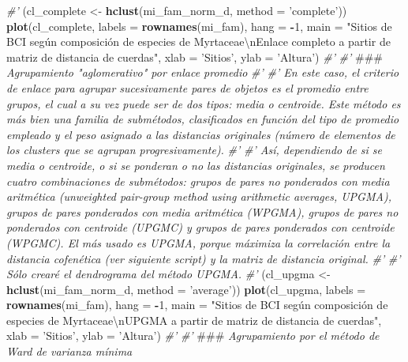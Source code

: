 \documentclass[11pt,]{article}
\newenvironment{Shaded}{\begin{snugshade}}{\end{snugshade}}
\newcommand{\KeywordTok}[1]{\textcolor[rgb]{0.13,0.29,0.53}{\textbf{#1}}}
\newcommand{\DataTypeTok}[1]{\textcolor[rgb]{0.13,0.29,0.53}{#1}}
\newcommand{\DecValTok}[1]{\textcolor[rgb]{0.00,0.00,0.81}{#1}}
\newcommand{\CharTok}[1]{\textcolor[rgb]{0.31,0.60,0.02}{#1}}
\newcommand{\StringTok}[1]{\textcolor[rgb]{0.31,0.60,0.02}{#1}}
\newcommand{\CommentTok}[1]{\textcolor[rgb]{0.56,0.35,0.01}{\textit{#1}}}
\newcommand{\OperatorTok}[1]{\textcolor[rgb]{0.81,0.36,0.00}{\textbf{#1}}}
\newcommand{\AlertTok}[1]{\textcolor[rgb]{0.94,0.16,0.16}{#1}}
\newcommand{\NormalTok}[1]{#1}
\begin{document}
\begin{Shaded}
\begin{Highlighting}[]
{\CommentTok{#' }
\NormalTok{(cl_complete <-}\StringTok{ }\KeywordTok{hclust}\NormalTok{(mi_fam_norm_d, }\DataTypeTok{method =} \StringTok{'complete'}\NormalTok{))}
\KeywordTok{plot}\NormalTok{(cl_complete, }\DataTypeTok{labels =} \KeywordTok{rownames}\NormalTok{(mi_fam), }\DataTypeTok{hang =} \OperatorTok{-}\DecValTok{1}\NormalTok{,}
     \DataTypeTok{main =} \StringTok{"Sitios de BCI según composición de especies de Myrtaceae}\CharTok{\textbackslash{}n}\StringTok{Enlace completo a partir de matriz de distancia de cuerdas"}\NormalTok{,}
     \DataTypeTok{xlab =} \StringTok{'Sitios'}\NormalTok{, }\DataTypeTok{ylab =} \StringTok{'Altura'}\NormalTok{)}
\CommentTok{#' }
\CommentTok{#' }\AlertTok{###}\CommentTok{ Agrupamiento "aglomerativo" por enlace promedio}
\CommentTok{#' }
\CommentTok{#' En este caso, el criterio de enlace para agrupar sucesivamente pares de objetos es el promedio entre grupos, el cual a su vez puede ser de dos tipos: media o centroide. Este método es más bien una familia de submétodos, clasificados en función del tipo de promedio empleado y el peso asignado a las distancias originales (número de elementos de los clusters que se agrupan progresivamente).}
\CommentTok{#' }
\CommentTok{#' Así, dependiendo de si se media o centroide, o si se ponderan o no las distancias originales, se producen cuatro combinaciones de submétodos: grupos de pares no ponderados con media aritmética (unweighted pair-group method using arithmetic averages, UPGMA), grupos de pares ponderados con media aritmética (WPGMA), grupos de pares no ponderados con centroide (UPGMC) y grupos de pares ponderados con centroide (WPGMC). El más usado es UPGMA, porque máximiza la correlación entre la distancia cofenética (ver siguiente script) y la matriz de distancia original.}
\CommentTok{#' }
\CommentTok{#' Sólo crearé el dendrograma del método UPGMA.}
\CommentTok{#' }
\NormalTok{(cl_upgma <-}\StringTok{ }\KeywordTok{hclust}\NormalTok{(mi_fam_norm_d, }\DataTypeTok{method =} \StringTok{'average'}\NormalTok{))}
\KeywordTok{plot}\NormalTok{(cl_upgma, }\DataTypeTok{labels =} \KeywordTok{rownames}\NormalTok{(mi_fam), }\DataTypeTok{hang =} \OperatorTok{-}\DecValTok{1}\NormalTok{,}
     \DataTypeTok{main =} \StringTok{"Sitios de BCI según composición de especies de Myrtaceae}\CharTok{\textbackslash{}n}\StringTok{UPGMA a partir de matriz de distancia de cuerdas"}\NormalTok{,}
     \DataTypeTok{xlab =} \StringTok{'Sitios'}\NormalTok{, }\DataTypeTok{ylab =} \StringTok{'Altura'}\NormalTok{)}
\CommentTok{#' }
\CommentTok{#' }\AlertTok{###}\CommentTok{ Agrupamiento por el método de Ward de varianza mínima}
}
\end{Highlighting}
\end{Shaded}
\end{document}
